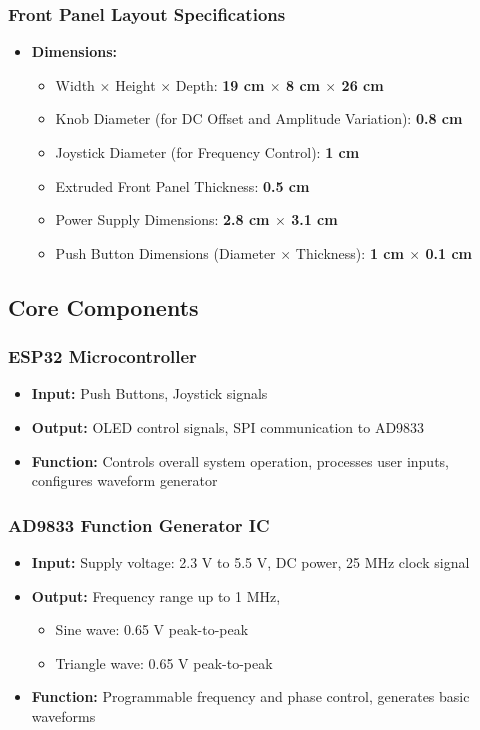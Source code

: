 \documentclass[12pt,a4paper]{article}
\begin{document}
\subsubsection{Front Panel Layout Specifications}
\begin{itemize}
    \item \textbf{Dimensions:} 
    \begin{itemize}
        \item Width $\times$ Height $\times$ Depth: \textbf{19 cm $\times$ 8 cm $\times$ 26 cm}
        \item Knob Diameter (for DC Offset and Amplitude Variation): \textbf{0.8 cm}
        \item Joystick Diameter (for Frequency Control): \textbf{1 cm} 
        \item Extruded Front Panel Thickness: \textbf{0.5 cm}
        \item Power Supply Dimensions: \textbf{2.8 cm $\times$ 3.1 cm}
        \item Push Button Dimensions (Diameter $\times$ Thickness): \textbf{1 cm $\times$ 0.1 cm}
    \end{itemize}
\end{itemize}


\subsection{Core Components}
\subsubsection{ESP32 Microcontroller}
    \begin{itemize}
        \item \textbf{Input:} Push Buttons, Joystick signals
        \item \textbf{Output:} OLED control signals, \gls{SPI} communication to AD9833
        \item \textbf{Function:} Controls overall system operation, processes user inputs, configures waveform generator
    \end{itemize}
    
\subsubsection{\gls{AD9833} Function Generator IC}
\begin{itemize}
    \item \textbf{Input:} Supply voltage: 2.3 V to 5.5 V, DC power, 25 MHz clock signal
    \item \textbf{Output:} Frequency range up to 1 MHz,  
          \begin{itemize}
              \item Sine wave: 0.65 V peak-to-peak
              \item Triangle wave: 0.65 V peak-to-peak
          \end{itemize}
    \item \textbf{Function:} Programmable frequency and phase control, generates basic waveforms
\end{itemize}
    
\end{document}
